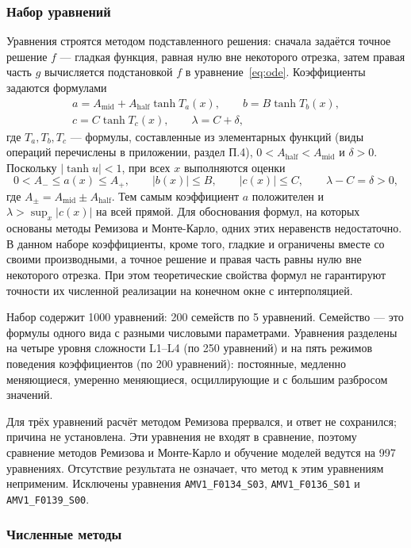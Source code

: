 \documentclass[14pt,a4paper]{extarticle}
\begin{document}
\subsubsection{Набор уравнений}
Уравнения строятся методом подставленного решения: сначала задаётся
точное решение $f$ --- гладкая функция, равная нулю вне некоторого
отрезка, затем правая часть $g$ вычисляется подстановкой $f$
в уравнение~\eqref{eq:ode}. Коэффициенты задаются формулами
\begin{equation}\label{eq:ml-coef}
\begin{gathered}
a=A_{\mathrm{mid}}+A_{\mathrm{half}}\tanh T_a(x),\qquad
b=B\tanh T_b(x),\\
c=C\tanh T_c(x),\qquad
\lambda=C+\delta,
\end{gathered}
\end{equation}
где $T_a,T_b,T_c$ --- формулы, составленные из элементарных функций
(виды операций перечислены в приложении, раздел П.4),
$0<A_{\mathrm{half}}<A_{\mathrm{mid}}$ и $\delta>0$. Поскольку
$|\tanh u|<1$, при всех $x$ выполняются оценки
\[
0<A_-\le a(x)\le A_+,\qquad |b(x)|\le B,\qquad |c(x)|\le C,\qquad
\lambda-C=\delta>0,
\]
где $A_\pm=A_{\mathrm{mid}}\pm A_{\mathrm{half}}$. Тем самым коэффициент
$a$ положителен и $\lambda>\sup_x|c(x)|$ на всей прямой.
Для обоснования формул, на которых основаны методы Ремизова
и Монте-Карло, одних этих неравенств недостаточно. В данном наборе
коэффициенты, кроме того, гладкие и ограничены вместе со своими
производными, а точное решение и правая часть равны нулю вне некоторого
отрезка. При этом теоретические свойства формул не гарантируют точности
их численной реализации на конечном окне с интерполяцией.

Набор содержит 1000 уравнений: 200 семейств по 5 уравнений. Семейство ---
это формулы одного вида с разными числовыми параметрами. Уравнения
разделены на четыре уровня сложности L1--L4 (по 250 уравнений) и на пять
режимов поведения коэффициентов (по 200 уравнений): постоянные, медленно
меняющиеся, умеренно меняющиеся, осциллирующие и с большим разбросом
значений.

Для трёх уравнений расчёт методом Ремизова прервался, и ответ
не сохранился; причина не установлена. Эти уравнения не входят
в сравнение, поэтому сравнение методов Ремизова и Монте-Карло
и обучение моделей ведутся на 997 уравнениях. Отсутствие результата не означает, что метод к этим
уравнениям неприменим. Исключены уравнения
\texttt{AMV1\_F0134\_S03}, \texttt{AMV1\_F0136\_S01}
и \texttt{AMV1\_F0139\_S00}.

\subsubsection{Численные методы}\label{sec:ml-methods}
\end{document}
